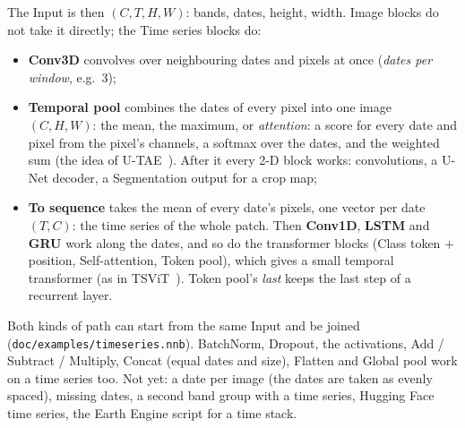 \documentclass[11pt,a4paper]{article}
\newcommand{\ui}[1]{\textbf{\textsf{#1}}}
\newcommand{\file}[1]{\texttt{#1}}
\begin{document}
The Input is then $(C, T, H, W)$: bands, dates, height, width. Image blocks do not take it directly; the Time series blocks do:
\begin{itemize}[nosep]
  \item \ui{Conv3D} convolves over neighbouring dates and pixels at once (\emph{dates per window}, e.g.\ 3);
  \item \ui{Temporal pool} combines the dates of every pixel into one image $(C, H, W)$: the mean, the maximum, or \emph{attention}: a
        score for every date and pixel from the pixel's channels, a softmax over the dates, and the weighted sum (the idea of
        U-TAE~\cite{garnot2021utae}). After it every 2-D block works: convolutions, a U-Net decoder, a Segmentation output for a crop map;
  \item \ui{To sequence} takes the mean of every date's pixels, one vector per date $(T, C)$: the time series of the whole patch. Then
        \ui{Conv1D}, \ui{LSTM} and \ui{GRU} work along the dates, and so do the transformer blocks (Class token + position,
        Self-attention, Token pool), which gives a small temporal transformer (as in TSViT~\cite{tarasiou2023tsvit}). Token pool's
        \emph{last} keeps the last step of a recurrent layer.
\end{itemize}
Both kinds of path can start from the same Input and be joined (\file{doc/examples/timeseries.nnb}). BatchNorm, Dropout, the activations,
Add / Subtract / Multiply, Concat (equal dates and size), Flatten and Global pool work on a time series too. Not yet: a date per image
(the dates are taken as evenly spaced), missing dates, a second band group with a time series, Hugging Face time series, the Earth
Engine script for a time stack.
\end{document}
